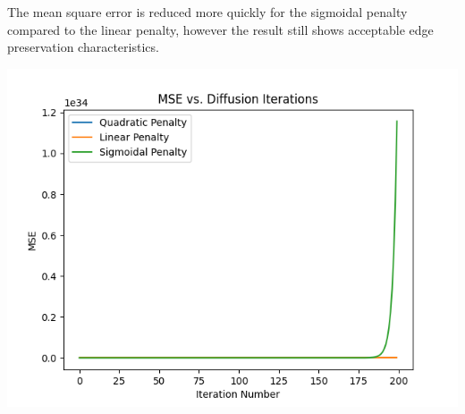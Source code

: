 \documentclass{article}
\begin{document}
  \noindent The mean square error is reduced more quickly for the sigmoidal penalty
  compared to the linear penalty, however the result still shows acceptable
  edge preservation characteristics.
  \begin{center}
    \includegraphics[scale=0.5]{../generated_images/MSE_test3.png}\\
  \end{center}
\end{document}
